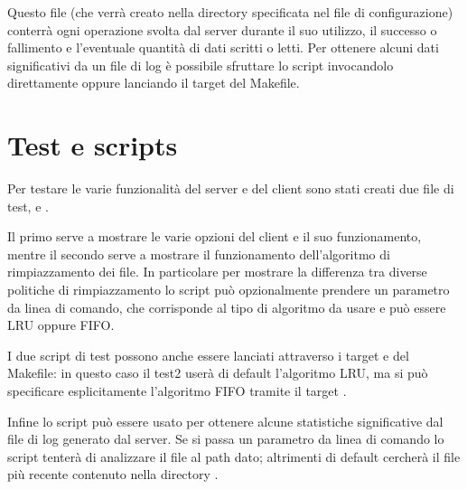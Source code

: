 \documentclass[11pt,oneface]{article}
\begin{document}
Questo file (che verrà creato nella directory specificata nel file di configurazione) conterrà ogni operazione svolta dal server durante il suo utilizzo, il successo o fallimento e l'eventuale quantità di dati scritti o letti. Per ottenere alcuni dati significativi da un file di log è possibile sfruttare lo script  invocandolo direttamente oppure lanciando il target  del Makefile.

\section{Test e scripts}
Per testare le varie funzionalità del server e del client sono stati creati due file di test,  e . 

Il primo serve a mostrare le varie opzioni del client e il suo funzionamento, mentre il secondo serve a mostrare il funzionamento dell'algoritmo di rimpiazzamento dei file.
In particolare per mostrare la differenza tra diverse politiche di rimpiazzamento lo script  può opzionalmente prendere un parametro da linea di comando, che corrisponde al tipo di algoritmo da usare e può essere LRU oppure FIFO.

I due script di test possono anche essere lanciati attraverso i target  e  del Makefile: in questo caso il test2 userà di default l'algoritmo LRU, ma si può specificare esplicitamente l'algoritmo FIFO tramite il target .

Infine lo script  può essere usato per ottenere alcune statistiche significative dal file di log generato dal server. Se si passa un parametro da linea di comando lo script tenterà di analizzare il file al path dato; altrimenti di default cercherà il file più recente contenuto nella directory .
\end{document}
